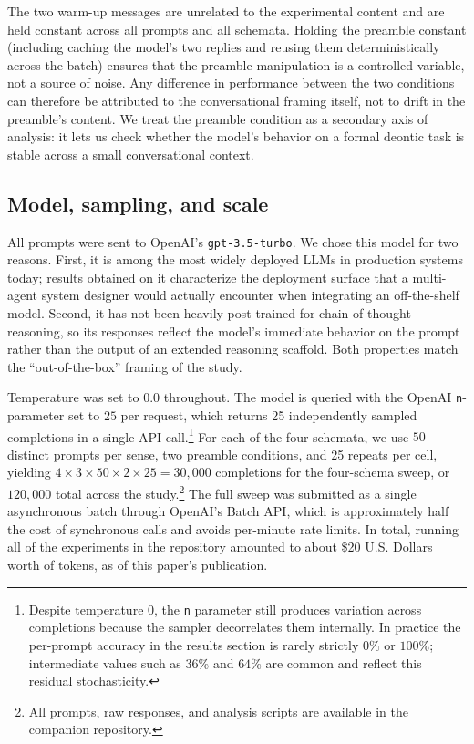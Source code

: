 The two warm-up messages are unrelated to the experimental content and
are held constant across all prompts and all schemata. Holding the
preamble constant (including caching the model's two replies and
reusing them deterministically across the batch) ensures that the
preamble manipulation is a controlled variable, not a source of noise.
Any difference in performance between the two conditions can therefore
be attributed to the conversational framing itself, not to drift in the
preamble's content. We treat the preamble condition as a secondary axis
of analysis: it lets us check whether the model's behavior on a formal
deontic task is stable across a small conversational context.

\subsection{Model, sampling, and scale}
\label{subsec:p1:methods:model}

All prompts were sent to OpenAI's \texttt{gpt-3.5-turbo}. We chose this
model for two reasons. First, it is among the most widely deployed LLMs
in production systems today; results obtained on it characterize the
deployment surface that a multi-agent system designer would actually
encounter when integrating an off-the-shelf model. Second, it has not
been heavily post-trained for chain-of-thought reasoning, so its
responses reflect the model's immediate behavior on the prompt rather
than the output of an extended reasoning scaffold. Both properties match
the ``out-of-the-box'' framing of the study. 

Temperature was set to $0.0$ throughout. The model is queried with the
OpenAI \texttt{n}-parameter set to $25$ per request, which returns 25
independently sampled completions in a single API call.\footnote{Despite
temperature $0$, the \texttt{n} parameter still produces variation
across completions because the sampler decorrelates them internally. In
practice the per-prompt accuracy in the results section is rarely
strictly $0\%$ or $100\%$; intermediate values such as $36\%$ and $64\%$
are common and reflect this residual stochasticity.} For each of the
four schemata, we use $50$ distinct prompts per sense, two preamble
conditions, and 25 repeats per cell, yielding
$4 \times 3 \times 50 \times 2 \times 25 = 30{,}000$ completions for
the four-schema sweep, or $120{,}000$ total across the study.\footnote{All
prompts, raw responses, and analysis scripts are available in the
companion repository.} The full sweep was submitted as a single
asynchronous batch through OpenAI's Batch API, which is approximately
half the cost of synchronous calls and avoids per-minute rate limits. In total, running all of the experiments in the repository amounted to about \$20 U.S. Dollars worth of tokens, as of this paper's publication.


